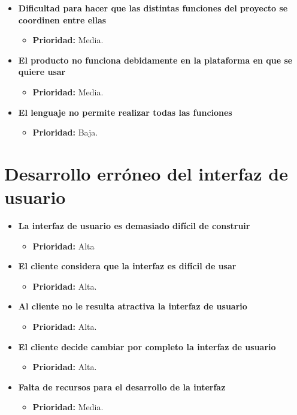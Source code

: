 \documentclass[spanish,a4paper,12pt]{report}	%
\begin{document}
\begin{itemize}
		\item \textbf{Dificultad para hacer que las distintas funciones del proyecto se coordinen entre ellas}
			\begin{itemize}
				\item \textbf{Prioridad: }Media.
			\end{itemize}
		

		\item \textbf{El producto no funciona debidamente en la plataforma en que se quiere usar}
			\begin{itemize}
				\item \textbf{Prioridad: }Media.
			\end{itemize}
		
		\item \textbf{El lenguaje no permite realizar todas las funciones}
			\begin{itemize}
				\item \textbf{Prioridad: }Baja.
			\end{itemize}

	\end{itemize}

%
\section{Desarrollo erróneo del interfaz de usuario}
	\begin{itemize}
		\item \textbf{La interfaz de usuario es demasiado difícil de construir}%
			\begin{itemize}
				\item \textbf{Prioridad: }Alta
			\end{itemize}
				
		\item \textbf{El cliente considera que la interfaz es difícil de usar}%
			\begin{itemize}
				\item \textbf{Prioridad: }Alta.
			\end{itemize}
		
		\item \textbf{Al cliente no le resulta atractiva la interfaz de usuario}%
			\begin{itemize}
				\item \textbf{Prioridad: }Alta.
			\end{itemize}
		
		\item \textbf{El cliente decide cambiar por completo la interfaz de usuario}%
			\begin{itemize}
				\item \textbf{Prioridad: }Alta.
			\end{itemize}

		\item \textbf{Falta de recursos para el desarrollo de la interfaz}
			\begin{itemize}
				\item \textbf{Prioridad: }Media.
			\end{itemize}

	\end{itemize}
%
\end{document}
